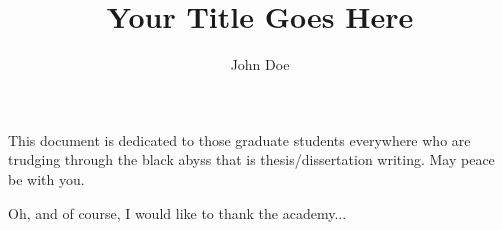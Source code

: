 \documentclass[master,tocprelim]{unrthesis}
\title{Your Title Goes Here}
\author{John Doe}
\begin{document}
\maketitle

\makecopyright

\makecommitteepage

\begin{abstract}
\lipsum[1]
\end{abstract}

\begin{dedication}
This document is dedicated to those graduate students everywhere who are trudging through the black abyss that is thesis/dissertation writing. \newline
May peace be with you.
\end{dedication}

\begin{acknowledgements}
\lipsum[2]

Oh, and of course, I would like to thank the academy...
\end{acknowledgements}

\contentspage
\tablelistpage
\figurelistpage
\end{document}
